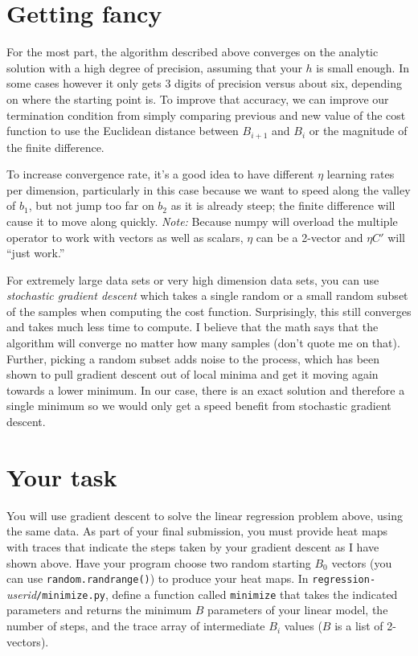 \documentclass[titlepage]{tufte-book}
\newcounter{problem}
\begin{document}
\begin{fullwidth}
\section{Getting fancy}

For the most part, the algorithm described above converges on the analytic solution with a high degree of precision, assuming that your $h$ is small enough. In some cases however it only gets 3 digits of precision versus about six, depending on where the starting point is. To improve that accuracy, we can improve our termination condition from simply comparing previous and new value of the cost function to use the Euclidean distance between $B_{i+1}$ and $B_i$ or the magnitude of the finite difference. 

To increase convergence rate, it's a good idea to have different $\eta$ learning rates per dimension, particularly in this case because we want to speed along the valley of $b_1$, but not jump too far on $b_2$ as it is already steep; the finite difference will cause it to move along quickly. {\em Note:} Because numpy will overload the {\tt *} multiple operator to work with vectors as well as scalars, $\eta$ can be a 2-vector and $\eta C'$ will ``just work.''

For extremely large data sets or very high dimension data sets, you can use {\em stochastic gradient descent} which takes a single random or a small random subset of the samples when computing the cost function. Surprisingly, this still converges and takes much less time to compute. I believe that the math says that the algorithm will converge no matter how many samples (don't quote me on that). Further, picking a random subset adds noise to the process, which has been shown to pull gradient descent out of local minima and get it moving again towards a lower minimum. In our case, there is an exact solution and therefore a single minimum so we would only get a speed benefit from stochastic gradient descent.

\section{Your task}

You will use gradient descent to solve the linear regression problem above, using the same data. As part of your final submission, you must provide heat maps with traces that indicate the steps taken by your gradient descent as I have shown above.  Have your program choose two random starting $B_0$ vectors (you can use {\tt random.randrange()}) to produce your heat maps.   In {\tt regression-}{\em userid}{\tt /minimize.py}, define a function called {\tt minimize} that takes the indicated parameters and returns the minimum $B$ parameters of your linear model, the number of steps, and the trace array of intermediate $B_i$ values ($B$ is a list of 2-vectors).


\end{fullwidth}
\end{document}
